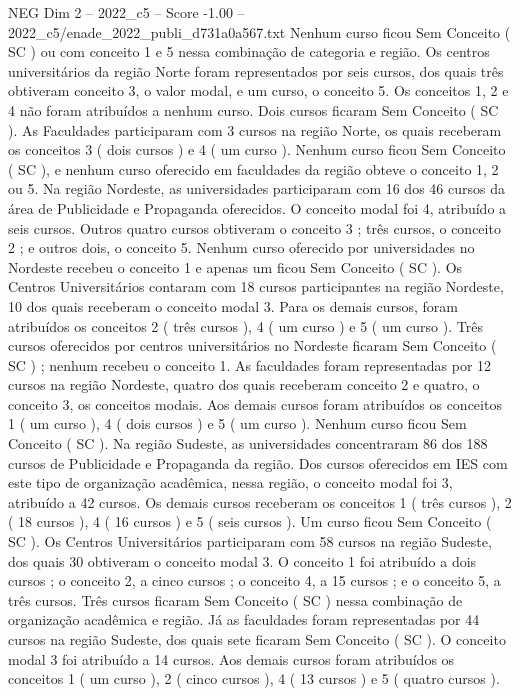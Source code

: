 \begin{textsample}{NEG Dim 2 – 2022\_c5 – Score -1.00 – 2022\_c5/enade\_2022\_publi\_d731a0a567.txt}
Nenhum curso ficou Sem Conceito ( SC ) ou com conceito 1 e 5 nessa combinação de categoria e região.
Os centros universitários da região Norte foram representados por seis cursos, dos quais três obtiveram conceito 3, o valor modal, e um curso, o conceito 5.
Os conceitos 1, 2 e 4 não foram atribuídos a nenhum curso.
Dois cursos ficaram Sem Conceito ( SC ).
As Faculdades participaram com 3 cursos na região Norte, os quais receberam os conceitos 3 ( dois cursos ) e 4 ( um curso ).
Nenhum curso ficou Sem Conceito ( SC ), e nenhum curso oferecido em faculdades da região obteve o conceito 1, 2 ou 5.
Na região Nordeste, as universidades participaram com 16 dos 46 cursos da área de Publicidade e Propaganda oferecidos.
O conceito modal foi 4, atribuído a seis cursos.
Outros quatro cursos obtiveram o conceito 3 ; três cursos, o conceito 2 ; e outros dois, o conceito 5.
Nenhum curso oferecido por universidades no Nordeste recebeu o conceito 1 e apenas um ficou Sem Conceito ( SC ).
Os Centros Universitários contaram com 18 cursos participantes na região Nordeste, 10 dos quais receberam o conceito modal 3.
Para os demais cursos, foram atribuídos os conceitos 2 ( três cursos ), 4 ( um curso ) e 5 ( um curso ).
Três cursos oferecidos por centros universitários no Nordeste ficaram Sem Conceito ( SC ) ; nenhum recebeu o conceito 1.
As faculdades foram representadas por 12 cursos na região Nordeste, quatro dos quais receberam conceito 2 e quatro, o conceito 3, os conceitos modais.
Aos demais cursos foram atribuídos os conceitos 1 ( um curso ), 4 ( dois cursos ) e 5 ( um curso ).
Nenhum curso ficou Sem Conceito ( SC ).
Na região Sudeste, as universidades concentraram 86 dos 188 cursos de Publicidade e Propaganda da região.
Dos cursos oferecidos em IES com este tipo de organização acadêmica, nessa região, o conceito modal foi 3, atribuído a 42 cursos.
Os demais cursos receberam os conceitos 1 ( três cursos ), 2 ( 18 cursos ), 4 ( 16 cursos ) e 5 ( seis cursos ).
Um curso ficou Sem Conceito ( SC ).
Os Centros Universitários participaram com 58 cursos na região Sudeste, dos quais 30 obtiveram o conceito modal 3.
O conceito 1 foi atribuído a dois cursos ; o conceito 2, a cinco cursos ; o conceito 4, a 15 cursos ; e o conceito 5, a três cursos.
Três cursos ficaram Sem Conceito ( SC ) nessa combinação de organização acadêmica e região.
Já as faculdades foram representadas por 44 cursos na região Sudeste, dos quais sete ficaram Sem Conceito ( SC ).
O conceito modal 3 foi atribuído a 14 cursos.
Aos demais cursos foram atribuídos os conceitos 1 ( um curso ), 2 ( cinco cursos ), 4 ( 13 cursos ) e 5 ( quatro cursos ).

\end{textsample}
